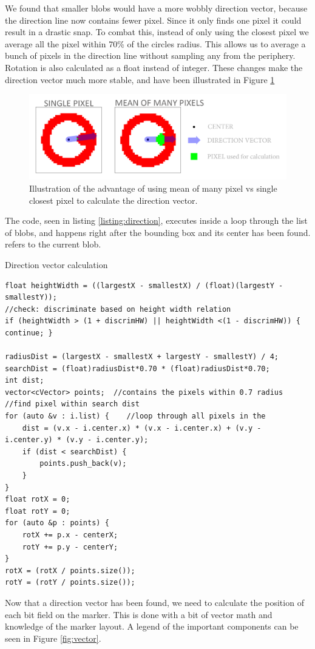 We found that smaller blobs would have a more wobbly direction vector, because the direction line now contains fewer pixel. Since it only finds one pixel it could result in a drastic snap. To combat this, instead of only using the closest pixel we average all the pixel within 70\% of the circles radius. This allows us to average a bunch of pixels in the direction line without sampling any from the
periphery. Rotation is also calculated as a float instead of integer. These changes make the direction vector much more stable, and have been illustrated in Figure \ref{fig:lowpixel}
\begin{figure}[H]
	\centering
	\includegraphics[width=1\linewidth]{figure/Analysis/lowpixel.png}
	\caption{Illustration of the advantage of using mean of many pixel vs single closest pixel to calculate the direction vector.} 
	\label{fig:lowpixel}
\end{figure}
 The code, seen in listing \ref{listing:direction}, executes inside a loop through the list of blobs, and happens right after the bounding box and its center has been found.  refers to the current blob.
\begin{listing}[H]
	\caption{Direction vector calculation}
	\begin{verbatim}
float heightWidth = ((largestX - smallestX) / (float)(largestY - smallestY));
//check: discriminate based on height width relation
if (heightWidth > (1 + discrimHW) || heightWidth <(1 - discrimHW)) { continue; }	

radiusDist = (largestX - smallestX + largestY - smallestY) / 4;
searchDist = (float)radiusDist*0.70 * (float)radiusDist*0.70;
int dist;
vector<cVector> points;  //contains the pixels within 0.7 radius
//find pixel within search dist
for (auto &v : i.list) {	//loop through all pixels in the
	dist = (v.x - i.center.x) * (v.x - i.center.x) + (v.y - i.center.y) * (v.y - i.center.y);
	if (dist < searchDist) {
		points.push_back(v);
	}
}
float rotX = 0;
float rotY = 0;
for (auto &p : points) {
	rotX += p.x - centerX;
	rotY += p.y - centerY;
}
rotX = (rotX / points.size());
rotY = (rotY / points.size());
	\end{verbatim}
	\label{listing:direction}
\end{listing}
Now that a direction vector has been found, we need to calculate the position of each bit field on the marker. This is done with a bit of vector math and knowledge of the marker layout. A legend of the important components can be seen in Figure \ref{fig:vector}.

